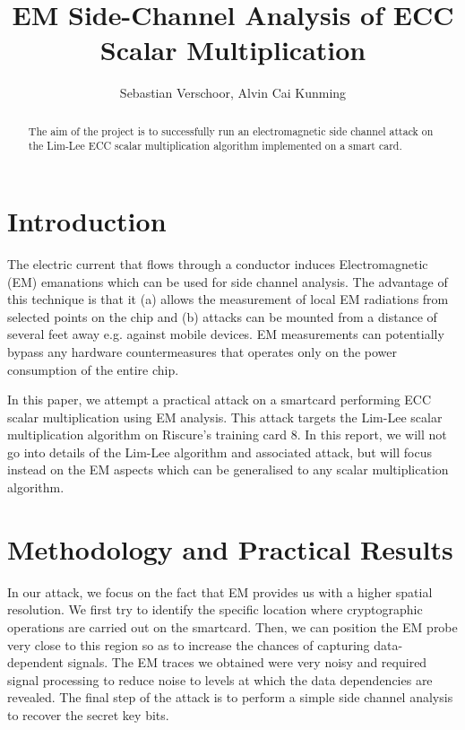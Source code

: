 \documentclass{llncs}
\begin{document}
\title{EM Side-Channel Analysis of ECC Scalar Multiplication}
\author{Sebastian Verschoor, Alvin Cai Kunming}
\maketitle
%
\begin{abstract}
The aim of the project is to successfully run an electromagnetic side channel
attack on the Lim-Lee ECC scalar multiplication algorithm implemented on a
smart card.  \end{abstract} 
%
\section{Introduction}

The electric current that flows through a conductor induces Electromagnetic
(EM) emanations which can be used for side channel analysis. The advantage of
this technique is that it (a) allows the measurement of local EM radiations
from selected points on the chip \cite{gandolfi2001} and (b) attacks can be
mounted from a distance of several feet away \cite{kenworthy2012} e.g. against
mobile devices. EM measurements can potentially bypass any hardware
countermeasures that operates only on the power consumption of the entire chip.

In this paper, we attempt a practical attack on a smartcard performing ECC
scalar multiplication using EM analysis. This attack targets the Lim-Lee scalar
multiplication algorithm on Riscure's training card 8. In this report, we will
not go into details of the Lim-Lee algorithm and associated attack, but will
focus instead on the EM aspects which can be generalised to any scalar
multiplication algorithm.

\section{Methodology and Practical Results}

In our attack, we focus on the fact that EM provides us with a higher spatial
resolution. We first try to identify the specific location where cryptographic
operations are carried out on the smartcard. Then, we can position the EM probe
very close to this region so as to increase the chances of capturing
data-dependent signals. The EM traces we obtained were very noisy and required
signal processing to reduce noise to levels at which the data dependencies are
revealed. The final step of the attack is to perform a simple side channel
analysis to recover the secret key bits.
\end{document}
